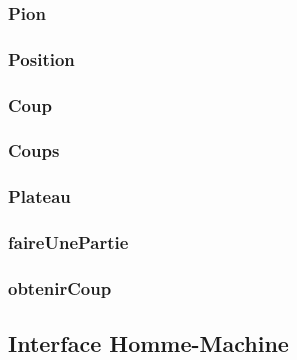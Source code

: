 \documentclass{article}
\begin{document}
\subsubsection{Pion}


\subsubsection{Position}


\subsubsection{Coup}


\subsubsection{Coups}


\subsubsection{Plateau}


\subsubsection{faireUnePartie}


\subsubsection{obtenirCoup}


\subsection{Interface Homme-Machine}                                                                                                                                                                      
                                                                                                                                               
                                                                                                                                                                                                         
\end{document}
